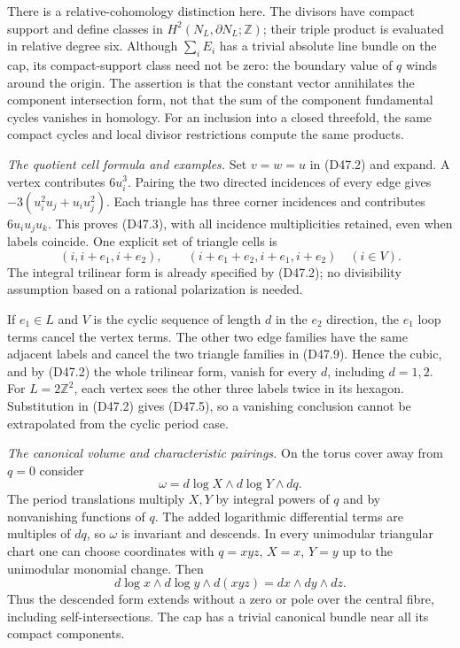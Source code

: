 There is a relative-cohomology distinction here. The
divisors have compact support and define classes in
$H^2(N_L,\partial N_L;\mathbb Z)$; their triple product
is evaluated in relative degree six. Although
$\sum_iE_i$ has a trivial absolute line bundle on the
cap, its compact-support class need not be zero: the
boundary value of $q$ winds around the origin.
The assertion is that the constant vector annihilates
the component intersection form, not that the sum of
the component fundamental cycles vanishes in homology.
For an inclusion into a closed threefold, the same
compact cycles and local divisor restrictions compute
the same products.

\emph{The quotient cell formula and examples.}
Set $v=w=u$ in (D47.2) and expand. A vertex contributes
$6u_i^3$. Pairing the two directed incidences of every
edge gives $-3(u_i^2u_j+u_iu_j^2)$. Each triangle has
three corner incidences and contributes $6u_iu_ju_k$.
This proves (D47.3), with all incidence multiplicities
retained, even when labels coincide.
One explicit set of triangle cells is
\[
 (i,i+e_1,i+e_2),\qquad
 (i+e_1+e_2,i+e_1,i+e_2)\quad(i\in V).                    \tag{D47.9}
\]
The integral trilinear form is already specified by
(D47.2); no divisibility assumption based on a rational
polarization is needed.

If $e_1\in L$ and $V$ is the cyclic sequence of length
$d$ in the $e_2$ direction, the $e_1$ loop terms cancel
the vertex terms. The other two edge families have the
same adjacent labels and cancel the two triangle
families in (D47.9). Hence the cubic, and by (D47.2)
the whole trilinear form, vanish for every $d$, including
$d=1,2$. For $L=2\mathbb Z^2$, each vertex sees the
other three labels twice in its hexagon. Substitution
in (D47.2) gives (D47.5), so a vanishing conclusion
cannot be extrapolated from the cyclic period case.

\emph{The canonical volume and characteristic pairings.}
On the torus cover away from $q=0$ consider
\[
                    \omega=d\log X\wedge d\log Y\wedge dq.
                                                               \tag{D47.10}
\]
The period translations multiply $X,Y$ by integral
powers of $q$ and by nonvanishing functions of $q$.
The added logarithmic differential terms are multiples
of $dq$, so $\omega$ is invariant and descends.
In every unimodular triangular chart one can choose
coordinates with $q=xyz$, $X=x$, $Y=y$ up to the
unimodular monomial change. Then
\[
                    d\log x\wedge d\log y\wedge d(xyz)
                                 =dx\wedge dy\wedge dz.
                                                               \tag{D47.11}
\]
Thus the descended form extends without a zero or pole
over the central fibre, including self-intersections.
The cap has a trivial canonical bundle near all its
compact components.

